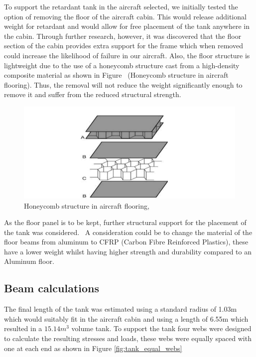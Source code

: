 To support the retardant tank in the aircraft selected, we initially tested the option of removing the floor of the aircraft cabin. This would release additional weight for retardant and would allow for free placement of the tank anywhere in the cabin. Through further research, however, it was discovered that the floor section of the cabin provides extra support for the frame which when removed could increase the likelihood of failure in our aircraft. Also, the floor structure is lightweight due to the use of a honeycomb structure cast from a high-density composite material as shown in Figure  (Honeycomb structure in aircraft flooring). Thus, the removal will not reduce the weight significantly enough to remove it and suffer from the reduced structural strength. 

\begin{figure}[!htbp]
\centering
\includegraphics[width= \linewidth]{../figures/honeycomb_structure_in_aircraft_flooring.jpg}
  \caption{Honeycomb structure in aircraft flooring, \cite{ganesh2015design}}
\label{fig:honeycomb_structure_in_aircraft_flooring}
\end{figure}
\FloatBarrier

As the floor panel is to be kept, further structural support for the placement of the tank was considered.  A consideration could be to change the material of the floor beams from aluminum to CFRP (Carbon Fibre Reinforced Plastics), these have a lower weight whilst having higher strength and durability compared to an Aluminum floor. 

\subsection{Beam calculations}
The final length of the tank was estimated using a standard radius of 1.03m which would suitably fit in the aircraft cabin and using a length of 6.55m which resulted in a $15.14 m^3$ volume tank. To support the tank four webs were designed to calculate the resulting stresses and loads, these webs were equally spaced with one at each end as shown in Figure \ref{fig:tank_equal_webs}



